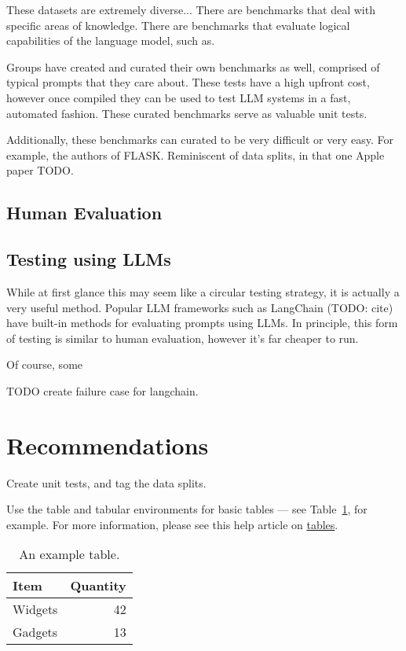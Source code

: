 \documentclass{article}
\begin{document}
These datasets are extremely diverse...
There are benchmarks that deal with specific areas of knowledge.
There are benchmarks that evaluate logical capabilities of the language model, such as.

Groups have created and curated their own benchmarks as well, comprised of typical prompts that they care about.
These tests have a high upfront cost, however once compiled they can be used to test LLM systems in a fast, automated fashion.
These curated benchmarks serve as valuable unit tests.

Additionally, these benchmarks can curated to be very difficult or very easy. 
For example, the authors of FLASK. 
Reminiscent of data splits, in that one Apple paper TODO.

\subsection{Human Evaluation}


\subsection{Testing using LLMs}

While at first glance this may seem like a circular testing strategy, it is actually a very useful method.
Popular LLM frameworks such as LangChain (TODO: cite) have built-in methods for evaluating prompts using LLMs.
In principle, this form of testing is similar to human evaluation, however it's far cheaper to run.

Of course, some 

TODO create failure case for langchain.


\section{Recommendations}

Create unit tests, and tag the data splits. 

Use the table and tabular environments for basic tables --- see Table~\ref{tab:widgets}, for example. For more information, please see this help article on \href{https://www.overleaf.com/learn/latex/tables}{tables}. 

\begin{table}
\centering
\begin{tabular}{l|r}
Item & Quantity \\\hline
Widgets & 42 \\
Gadgets & 13
\end{tabular}
\caption{\label{tab:widgets}An example table.}
\end{table}
\end{document}
